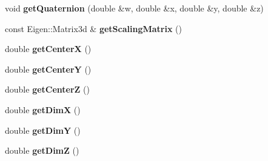 \begin{DoxyCompactItemize}
\item 
\hypertarget{classhiqp_1_1geometric__primitives_1_1GeometricBox_ad92b80f4b613257574f8fe178e9bb329}{void {\bfseries get\-Quaternion} (double \&w, double \&x, double \&y, double \&z)}\label{classhiqp_1_1geometric__primitives_1_1GeometricBox_ad92b80f4b613257574f8fe178e9bb329}

\item 
\hypertarget{classhiqp_1_1geometric__primitives_1_1GeometricBox_acd1f99817d10aa2765498322fb503c09}{const Eigen\-::\-Matrix3d \& {\bfseries get\-Scaling\-Matrix} ()}\label{classhiqp_1_1geometric__primitives_1_1GeometricBox_acd1f99817d10aa2765498322fb503c09}

\item 
\hypertarget{classhiqp_1_1geometric__primitives_1_1GeometricBox_adbfbd7788959ac285a96e5eff56a5c61}{double {\bfseries get\-Center\-X} ()}\label{classhiqp_1_1geometric__primitives_1_1GeometricBox_adbfbd7788959ac285a96e5eff56a5c61}

\item 
\hypertarget{classhiqp_1_1geometric__primitives_1_1GeometricBox_a9cdcda87654088a51bc821b67ce88942}{double {\bfseries get\-Center\-Y} ()}\label{classhiqp_1_1geometric__primitives_1_1GeometricBox_a9cdcda87654088a51bc821b67ce88942}

\item 
\hypertarget{classhiqp_1_1geometric__primitives_1_1GeometricBox_ab4c3f4453b9167e2f82fff1b236a95d7}{double {\bfseries get\-Center\-Z} ()}\label{classhiqp_1_1geometric__primitives_1_1GeometricBox_ab4c3f4453b9167e2f82fff1b236a95d7}

\item 
\hypertarget{classhiqp_1_1geometric__primitives_1_1GeometricBox_a8f5ccb354be710855b20adb54bf207f3}{double {\bfseries get\-Dim\-X} ()}\label{classhiqp_1_1geometric__primitives_1_1GeometricBox_a8f5ccb354be710855b20adb54bf207f3}

\item 
\hypertarget{classhiqp_1_1geometric__primitives_1_1GeometricBox_a954412b5c06750258d5250ae1c206622}{double {\bfseries get\-Dim\-Y} ()}\label{classhiqp_1_1geometric__primitives_1_1GeometricBox_a954412b5c06750258d5250ae1c206622}

\item 
\hypertarget{classhiqp_1_1geometric__primitives_1_1GeometricBox_a07282003e93d457b36e5d09a6774f2c9}{double {\bfseries get\-Dim\-Z} ()}\label{classhiqp_1_1geometric__primitives_1_1GeometricBox_a07282003e93d457b36e5d09a6774f2c9}

\end{DoxyCompactItemize}
